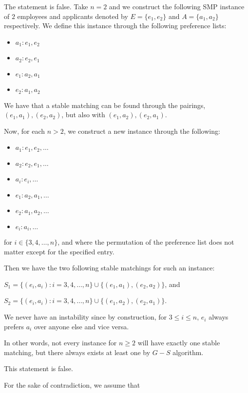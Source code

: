 \documentclass[11pt,fleqn]{exam}
\newenvironment{soln}{\color{solnblue}}{}
\newif\ifsolutions\solutionsfalse
\begin{document}
\begin{soln}
	The statement is false. Take \(n = 2\) and we construct the following SMP instance of \(2\) employees and applicants denoted by
	\(E = \{e_1, e_2\}\) and \(A = \{a_1, a_2\}\) respectively. We define this instance through the following preference lists:

	\begin{itemize}
		\item \(a_1 : e_1, e_2\)
		\item \(a_2 : e_2, e_1\)
		\item \(e_1 : a_2, a_1\)
		\item \(e_2 : a_1, a_2\)
	\end{itemize}

	We have that a stable matching can be found through the pairings, \((e_1, a_1), (e_2, a_2)\), but also with \((e_1, a_2), (e_2, a_1)\).

	Now, for each \(n > 2\), we construct a new instance through the following:

	\begin{itemize}
		\item \(a_1 : e_1, e_2, \dots\)
		\item \(a_2 : e_2, e_1, \dots\)
		\item \(a_i : e_i, \dots\)
		\item \(e_1 : a_2, a_1, \dots\)
		\item \(e_2 : a_1, a_2, \dots\)
		\item \(e_i : a_i, \dots\)
	\end{itemize}

	for \(i \in \{3, 4, \dots, n\}\), and where the permutation of the preference list does not matter except for the specified entry.

	Then we have the two following stable matchings for such an instance:

	\(S_1 = \{(e_i, a_i) : i = 3, 4, \dots, n\} \cup \{(e_1, a_1), (e_2, a_2)\}\), and

	\(S_2 = \{(e_i, a_i) : i = 3, 4, \dots, n\} \cup \{(e_1, a_2), (e_2, a_1)\}\).

	We never have an instability since by construction, for \(3 \leq i \leq n\), \(e_i\) always prefers \(a_i\) over anyone else and vice versa.

	In other words, not every instance for \(n \geq 2\) will have exactly one stable matching, but there always exists at least one by \(G-S\) algorithm.



\end{soln}



\ifsolutions\else\newpage\fi

\begin{soln}
	This statement is false.

	For the sake of contradiction, we assume that
\end{soln}


\ifsolutions\else\newpage\fi


\ifsolutions\else\newpage\fi
\end{document}
